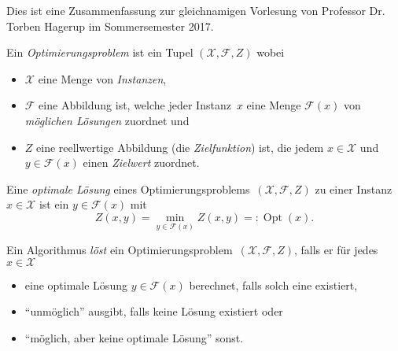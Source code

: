 \documentclass{cheat-sheet}
\newcommand{\Instances}{\mathcal{X}} %
\newcommand{\Feasible}{\mathcal{F}} %
\newcommand{\ObjFun}{Z} %
\newcommand{\OptTuple}{(\Instances{}, \Feasible{}, \ObjFun{})} %
\DeclareMathOperator{\Opt}{Opt} %
\begin{document}
\raggedcolumns %


Dies ist eine Zusammenfassung zur gleichnamigen Vorlesung von Professor Dr. Torben Hagerup im Sommersemester 2017.




\begin{defn}
  Ein \emph{Optimierungsproblem} ist ein Tupel $\OptTuple$ wobei
  \begin{itemize}
    \item $\Instances$ eine Menge von \emph{Instanzen},
    \item $\Feasible$ eine Abbildung ist, welche jeder Instanz~$x$ eine Menge $\Feasible(x)$ von \emph{möglichen Lösungen} zuordnet und
    \item $\ObjFun$ eine reellwertige Abbildung (die \emph{Zielfunktion}) ist, die jedem $x \in \Instances$ und $y \in \Feasible(x)$ einen \textit{Zielwert} zuordnet.
  \end{itemize}
\end{defn}

\begin{defn}
  Eine \emph{optimale Lösung} eines Optimierungsproblems~$\OptTuple$ zu einer Instanz~$x \in \Instances$ ist ein $y \in \Feasible(x)$ mit
  \[ \ObjFun(x, y) = \min_{y \in \Feasible(x)} Z(x, y) =: \Opt(x). \]
\end{defn}

\begin{defn}
  Ein Algorithmus \emph{löst} ein Optimierungsproblem~$\OptTuple$, falls er für jedes $x \in \Instances$
  \begin{itemize}
    \item eine optimale Lösung $y \in \Feasible(x)$ berechnet, falls solch eine existiert,
    \item "`unmöglich"' ausgibt, falls keine Lösung existiert oder
    \item "`möglich, aber keine optimale Lösung"' sonst.
  \end{itemize}
\end{defn}
\end{document}
